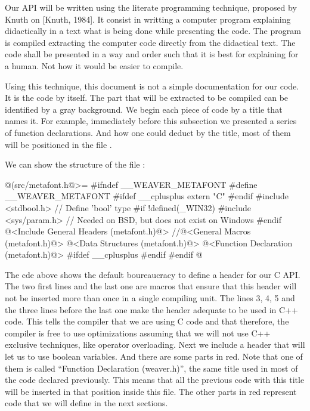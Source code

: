 
Our API will be written using the literate programming technique,
proposed by Knuth on [Knuth, 1984]. It consist in writting a computer
program explaining didactically in a text what is being done while
presenting the code. The program is compiled extracting the computer
code directly from the didactical text. The code shall be presented in
a way and order such that it is best for explaining for a human. Not
how it would be easier to compile.

Using this technique, this document is not a simple documentation for
our code. It is the code by itself. The part that will be extracted to
be compiled can be identified by a gray background. We begin each
piece of code by a title that names it. For example, immediately
before this subsection we presented a series of function
declarations. And how one could deduct by the title, most of them will
be positioned in the file .

We can show the structure of the file :

\iniciocodigo
@(src/metafont.h@>=
#ifndef __WEAVER_METAFONT
#define __WEAVER_METAFONT
#ifdef __cplusplus
extern "C" {
#endif
#include <stdbool.h> // Define  'bool' type
#if !defined(_WIN32)
#include <sys/param.h> // Needed on BSD, but does not exist on Windows
#endif  
@<Include General Headers (metafont.h)@>
//@<General Macros (metafont.h)@>
@<Data Structures (metafont.h)@>
@<Function Declaration (metafont.h)@>
#ifdef __cplusplus
}
#endif
#endif
@
\fimcodigo

The cde above shows the default boureaucracy to define a header for
our C API. The two first lines and the last one are macros that ensure
that this header will not be inserted more than once in a single
compiling unit. The lines 3, 4, 5 and the three lines before the last
one make the header adequate to be used in C++ code. This tells the
compiler that we are using C code and that therefore, the compiler is
free to use optimizations assuming that we will not use C++ exclusive
techniques, like operator overloading. Next we include a header that
will let us to use boolean variables. And there are some parts in
red. Note that one of them is called ``Function Declaration
(weaver.h)'', the same title used in most of the code declared
previously. This means that all the previous code with this title will
be inserted in that position inside this file. The other parts in red
represent code that we will define in the next sections.

